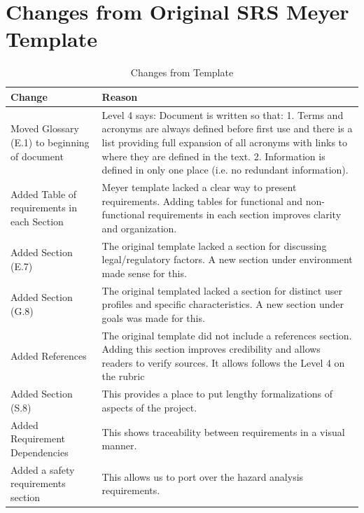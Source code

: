 \documentclass{article}
\begin{document}
\section*{Changes from Original SRS Meyer Template}
\begin{table}[H]
\caption{Changes from Template} \label{ChangesFromTemplate}
\begin{tabularx}{\textwidth}{|p{4cm}|>{\raggedright\arraybackslash}X|}
\hline
\textbf{Change} & \textbf{Reason} \\
\hline
Moved Glossary (E.1) to beginning of document & Level 4 says: Document is written so that: 1. Terms and acronyms are always defined before first use and there is a list providing full expansion of all acronyms with links to where they are defined in the text. 2. Information is defined in only one place (i.e. no redundant information). \\
\hline
Added Table of requirements in each Section & Meyer template lacked a clear way to present requirements. Adding tables for functional and non-functional requirements in each section improves clarity and organization. \\
\hline
Added Section (E.7) & The original template lacked a section for discussing legal/regulatory factors. A new section under environment made sense for this. \\
\hline
Added Section (G.8) & The original templated lacked a section for distinct user profiles and specific characteristics. A new section under goals was made for this.\\
\hline
Added References & The original template did not include a references section. Adding this section improves credibility and allows readers to verify sources. It allows follows the Level 4 on the rubric \\
\hline
Added Section (S.8) & This provides a place to put lengthy formalizations of aspects of the project. \\
\hline
Added Requirement Dependencies & This shows traceability between requirements in a visual manner. \\
\hline
Added a safety requirements section & This allows us to port over the hazard analysis requirements. \\
\hline
\end{tabularx}
\end{table}

\newpage

\medskip
\end{document}

